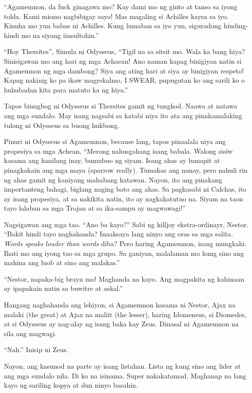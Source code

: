 \documentclass[12pt,letterpaper]{report}
\begin{document}
``Agamemnon, da fuck ginagawa mo? Kay dami mo ng ginto at tanso sa iyong tolda. Kami mismo nagbibigay sayo! Mas magaling si Achilles kaysa sa iyo. Kinuha mo yun babae ni Achilles. Kung lumaban sa iyo yun, siguradong hinding-hindi mo na siyang iinsultohin.''

``Hoy Thersites'', Simula ni Odysseus, ``Tigil na sa sitsit mo. Wala ka bang hiya? Sinisigawan mo ang hari ng mga Achaean! Ano naman kapag binigiyan natin si Agamemnon ng mga dambong? Siya ang ating hari at siya ay binigiyan respeto! Kapag nakinig ko pa ikaw magrekalmo, I SWEAR, pupugutan ko ang sarili ko o huhubadan kita para matuto ka ng hiya.''

Tapos binugbog ni Odysseus si Thersites gamit ng tungkod. Naawa at natawa ang mga sundalo. May isang nagsabi sa katabi niya ito ata ang pinakamalaking tulong ni Odysseus sa buong hukbong.

Pinuri ni Odysseus si Agamemnon, because lang, tapos pinaalala niya ang propesiya sa mga Achean, ``Merong nahusgahang isang babala. Walong sisiw kasama ang kanilang inay, bumubuo ng siyam. Isang ahas ay lumapit at pinagkakain ang mga maya (sparrow really). Tumakas ang nanay, pero nahuli rin ng ahas gamit ng kaniyang mahabang katawan. Nayon, ito ang pinakang importanteng bahagi, biglang naging bato ang ahas. Sa pagkasabi ni Calchas, ito ay isang propesiya, at sa nakikita natin, ito ay nagkakatutuo na. Siyam na taon tayo lalaban sa mga Trojan at sa ika-sampu ay magwawagi!''

Nagsigawan ang mga tao. ``Ano ba kayo?'' Sabi ng killjoy ekstra-ordinayr, Nestor. ``Bakit hindi tayo naghahanda? Inaaksaya lang ninyo ang oras sa mga salita. \textit{Words speaks louder than words} diba? Pero haring Agamemnon, isang mungkahi. Ihati mo ang iyong tao sa mga grupo. Sa ganiyan, malalaman mo kung sino ang mahina ang luob at sino ang malakas.''

``Nestor, napaka-big brayn mo! Maghanda na kayo. Ang magpakita ng kahinaan ay ipapakain natin sa buwitre at askal.''

Hangang naghahanda ang lehiyon, si Agamemnon kasama ni Nestor, Ajax na malaki (the great) at Ajax na maliit (the lesser), haring Idomeneus, si Diomedes, at si Odysseus ay nag-alay ng isang baka kay Zeus. Dinasal ni Agamemnon na sila ang magwagi.

``Nah.'' Inisip ni Zeus.

Nayon, ang kasunod na parte ay isang listahan. Lista ng kung sino ang lider at ang mga sundalo nila. Di ko na isinama. Super nakakatamad. Maghanap na lang kayo ng sariling kopya at dun ninyo basahin.
\end{document}
